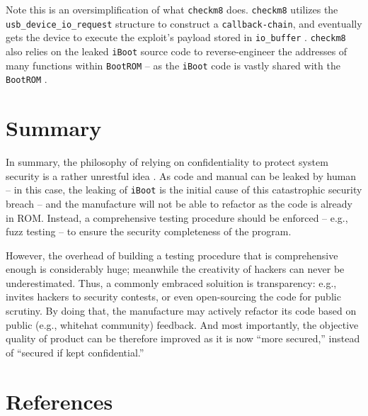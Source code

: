 \documentclass[10pt]{article}
\newcommand{\inlinecode}{\texttt}
\begin{document}
Note this is an oversimplification of what \inlinecode{checkm8} does. \inlinecode{checkm8} utilizes the \inlinecode{usb\_device\_io\_request} structure to construct a \inlinecode{callback-chain}, and eventually gets the device to execute the exploit's payload stored in \inlinecode{io\_buffer} \cite{cite:4}. \inlinecode{checkm8} also relies on the leaked \inlinecode{iBoot} source code to reverse-engineer the addresses of many functions within \inlinecode{BootROM} -- as the \inlinecode{iBoot} code is vastly shared with the \inlinecode{BootROM} \cite{cite:4}\cite{cite:1}.


\section{Summary}
In summary, the philosophy of relying on confidentiality to protect system security is a rather unrestful idea \cite{cite:1}. As code and manual can be leaked by human -- in this case, the leaking of \inlinecode{iBoot} is the initial cause of this catastrophic security breach -- and the manufacture will not be able to refactor as the code is already in ROM. Instead, a comprehensive testing procedure should be enforced -- e.g., fuzz testing -- to ensure the security completeness of the program.

However, the overhead of building a testing procedure that is comprehensive enough is considerably huge; meanwhile the creativity of hackers can never be underestimated. Thus, a commonly embraced soluition is transparency: e.g., invites hackers to security contests, or even open-sourcing the code for public scrutiny. By doing that, the manufacture may actively refactor its code based on public (e.g., whitehat community) feedback. And most importantly, the objective quality of product can be therefore improved as it is now ``more secured,'' instead of ``secured if kept confidential.''


\newpage
\section{References}

\nocite{*}
\raggedright


\end{document}
